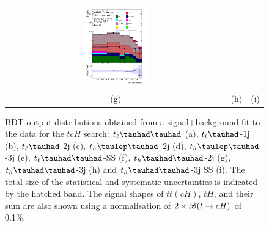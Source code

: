 \documentclass[PAPER, coverpage, atlasdraft=true, texlive=2016, UKenglish]{\ATLASLATEXPATH atlasdoc}
\begin{document}
\begin{figure}[H]
\begin{tabular}{@{}ccc@{}}
\includegraphics[width=0.29\textwidth]{figures/tcH_reg2mtau1b3jss.pdf}\\
(g) & (h)  & (i) \\
\end{tabular}
\caption{ BDT output distributions obtained from a signal+background fit to the data for the $tcH$ search: 
$t_{\ell}\thadhad$ (a), $t_{\ell}\tauhad$-1j (b),  $t_{\ell}\tauhad$-2j (c), $t_h\tlhad$-2j (d), $t_h\tlhad$-3j (e), $t_{\ell}\thadhad$-SS (f), $t_h\thadhad$-2j (g), $t_h\thadhad$-3j (h) and $t_h\thadhad$-3j SS (i). 
The total size of the statistical and systematic
uncertainties is indicated by the hatched band. The signal shapes of $tt(cH)$, $tH$, and their sum are also shown using a normalisation of $2 \times\mathscr{B}(t\to cH)$ of 0.1\%.
}
\label{fig:asimov_postfitbdtHc}
\end{figure}
\end{document}
